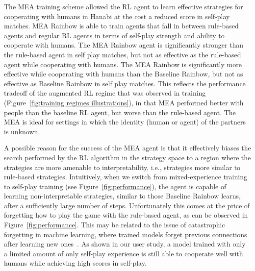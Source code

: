 \documentclass[letterpaper]{article} %
\begin{document}


The MEA training scheme allowed the RL agent to learn effective strategies for cooperating with humans in Hanabi at the cost a reduced score in self-play matches. MEA Rainbow is able to train agents that fall in between rule-based agents and regular RL agents in terms of self-play strength and ability to cooperate with humans. The MEA Rainbow agent is significantly stronger than the rule-based agent in self play matches, but not as effective as the rule-based agent while cooperating with humans. The MEA Rainbow is significantly more effective while cooperating with humans than the Baseline Rainbow, but not as effective as Baseline Rainbow in self play matches.
This reflects   the  performance tradeoff  of the augmented RL regime that was observed in training (Figure~\ref{fig:training regimes illustrations}),  in that   MEA   performed better with people than the baseline RL agent, but worse than the rule-based agent.
The MEA is ideal for settings in which the identity (human or agent) of the partners is unknown.

A possible reason for the success of the MEA agent is that it  effectively biases the search performed by the RL algorithm in the strategy space to a region where the strategies are more amenable to interpretability, i.e., strategies more similar to rule-based strategies. Intuitively, when we switch from mixed-experience training to self-play training (see Figure~\ref{fig:performance}), the agent is capable of learning non-interpretable strategies, similar to those Baseline Rainbow learns, after a sufficiently large number of steps. Unfortunately this comes at the price of forgetting how to play the game with the rule-based agent, as can be observed in Figure~\ref{fig:performance}. This may be  related to the issue of catastrophic forgetting in machine learning, where trained models forget previous connections after learning new ones~\cite{mccloskey:catastrophic}. As shown in our user study, a model trained with only a limited amount of only self-play experience is still able to cooperate well with humans while achieving high scores in self-play.
\end{document}
